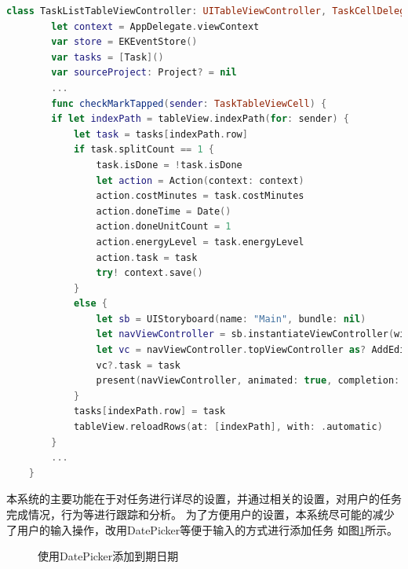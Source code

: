 \begin{lstlisting}[language={Swift}, caption={TaskListTableViewController实现代理的相关代码}]
	class TaskListTableViewController: UITableViewController, TaskCellDelegate {
		let context = AppDelegate.viewContext
		var store = EKEventStore()
		var tasks = [Task]()
		var sourceProject: Project? = nil
		...
		func checkMarkTapped(sender: TaskTableViewCell) {
        if let indexPath = tableView.indexPath(for: sender) {
            let task = tasks[indexPath.row]
            if task.splitCount == 1 {
                task.isDone = !task.isDone
                let action = Action(context: context)
                action.costMinutes = task.costMinutes
                action.doneTime = Date()
                action.doneUnitCount = 1
                action.energyLevel = task.energyLevel
                action.task = task
                try! context.save()
            }
            else {
                let sb = UIStoryboard(name: "Main", bundle: nil)
                let navViewController = sb.instantiateViewController(withIdentifier: "navAEAction") as! UINavigationController
                let vc = navViewController.topViewController as? AddEditActionTableViewController
                vc?.task = task
                present(navViewController, animated: true, completion: nil)
            }
            tasks[indexPath.row] = task
            tableView.reloadRows(at: [indexPath], with: .automatic)
		}
		...
    }
\end{lstlisting}

本系统的主要功能在于对任务进行详尽的设置，并通过相关的设置，对用户的任务完成情况，行为等进行跟踪和分析。
为了方便用户的设置，本系统尽可能的减少了用户的输入操作，改用DatePicker等便于输入的方式进行添加任务
如图\ref{fig:add_task_duedate}所示。

\begin{figure}[H]
	\centering
	\caption{使用DatePicker添加到期日期}
	\label{fig:add_task_duedate}
\end{figure}

